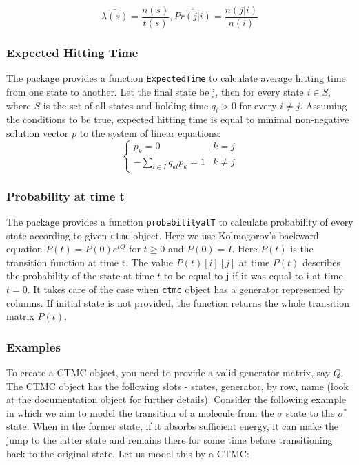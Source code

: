 \documentclass[
  nojss]{jss}
\begin{document}
\[
\hat{\lambda(s)} = \frac{n(s)}{t(s)},\hat{Pr(j|i)}=\frac{n(j|i)}{n(i)}
\]

\hypertarget{expected-hitting-time}{%
\subsubsection{Expected Hitting Time}\label{expected-hitting-time}}

The package provides a function \texttt{ExpectedTime} to calculate average hitting time from one state to another. Let the final state be j, then for every state \(i \in S\), where \(S\) is the set of all states and holding time \(q_{i} > 0\) for every \(i \neq j\). Assuming the conditions to be true, expected hitting time is equal to minimal non-negative solution vector \(p\) to the system of linear equations:
\begin{equation}
\begin{cases}
      p_{k} = 0 & k = j \\
      -\sum_{l \in I} q_{kl}p_{k} = 1 & k \neq j
\end{cases}
\label{eq:EHT}
\end{equation}

\hypertarget{probability-at-time-t}{%
\subsubsection{Probability at time t}\label{probability-at-time-t}}

The package provides a function \texttt{probabilityatT} to calculate probability of every state according to given \texttt{ctmc} object. Here we use Kolmogorov's backward equation \(P(t) = P(0)e^{tQ}\) for \(t \geq 0\) and \(P(0) = I\). Here \(P(t)\) is the transition function at time t. The value \(P(t)[i][j]\) at time \(P(t)\) describes the probability of the state at time \(t\) to be equal to j if it was equal to i at time \(t=0\).
It takes care of the case when \texttt{ctmc} object has a generator represented by columns.
If initial state is not provided, the function returns the whole transition matrix \(P(t)\).

\hypertarget{examples}{%
\subsubsection{Examples}\label{examples}}

To create a CTMC object, you need to provide a valid generator matrix, say \(Q\). The CTMC object has the following slots - states, generator, by row, name (look at the documentation object for further details). Consider the following example in which we aim to model the transition of a molecule from the \(\sigma\) state to the \(\sigma^*\) state. When in the former state, if it absorbs sufficient energy, it can make the jump to the latter state and remains there for some time before transitioning back to the original state. Let us model this by a CTMC:
\end{document}
